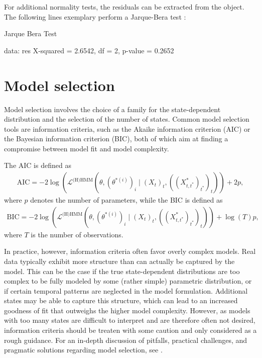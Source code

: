 \documentclass[article]{jss}
\begin{document}
For additional normality tests, the residuals can be extracted from the  object. The following lines exemplary perform a Jarque-Bera test \cite{jar87}:

%
\begin{Schunk}
\begin{Soutput}
	Jarque Bera Test

data:  res
X-squared = 2.6542, df = 2, p-value = 0.2652
\end{Soutput}
\end{Schunk}
%


\section{Model selection} \label{sec:model_selection} %

Model selection involves the choice of a family for the state-dependent distribution and the selection of the number of states. Common model selection tools are information criteria, such as the Akaike information criterion (AIC) or the Bayesian information criterion (BIC), both of which aim at finding a compromise between model fit and model complexity.

The AIC is defined as
\begin{align*}
\text{AIC} = - 2 \log (\mathcal{L}^\text{(H)HMM}(\theta,(\theta^{*(i)})_i\mid (X_t)_t,((X^*_{t,t^*})_{t^*})_t)) + 2 p,
\end{align*}
where $p$ denotes the number of parameters, while the BIC is defined as
\begin{align*}
\text{BIC} = - 2 \log (\mathcal{L}^\text{(H)HMM}(\theta,(\theta^{*(i)})_i\mid (X_t)_t,((X^*_{t,t^*})_{t^*})_t)) + \log(T) p,
\end{align*}
where $T$ is the number of observations.

In practice, however, information criteria often favor overly complex models. Real data typically exhibit more structure than can actually be captured by the model. This can be the case if the true state-dependent distributions are too complex to be fully modeled by some (rather simple) parametric distribution, or if certain temporal patterns are neglected in the model formulation. Additional states may be able to capture this structure, which can lead to an increased goodness of fit that outweighs the higher model complexity. However, as models with too many states are difficult to interpret and are therefore often not desired, information criteria should be treaten with some caution and only considered as a rough guidance. For an in-depth discussion of pitfalls, practical challenges, and pragmatic solutions regarding model selection, see \cite{poh17}.
\end{document}
